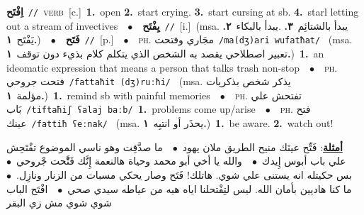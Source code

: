 \documentclass[10pt,a4paper,twoside]{article} %
\begin{document}
\begin{multicols}{2}
{{{\setlength\topsep{0pt}\textbf{\foreignlanguage{arabic}{اِفْتَح}}\ {\color{gray}\texttt{//}\color{black}}\ \textsc{verb}\ [c.]\ \textbf{1.}~open  \textbf{2.}~start crying.  \textbf{3.}~start cursing at sb.  \textbf{4.}~starl letting out a stream of invectives\ \ $\bullet$\ \ \setlength\topsep{0pt}\textbf{\foreignlanguage{arabic}{يِفْتَح}}\ {\color{gray}\texttt{//}\color{black}}\ [i.]\ \color{gray}(msa. \foreignlanguage{arabic}{يبدأ بالشتائِم}~\foreignlanguage{arabic}{\textbf{٣.}}  .\foreignlanguage{arabic}{يبدأ بالبكاء}~\foreignlanguage{arabic}{\textbf{٢.}}  \foreignlanguage{arabic}{يَفْتَح}~\foreignlanguage{arabic}{\textbf{١.}})\color{black}\ \ $\bullet$\ \ \setlength\topsep{0pt}\textbf{\foreignlanguage{arabic}{فَتَح}}\ {\color{gray}\texttt{//}\color{black}}\ [p.]\ \ $\bullet$\ \ \textsc{ph.} \color{gray} \foreignlanguage{arabic}{مجَاري وفتحت}\color{black}\ {\color{gray}\texttt{/{\sffamily ma(dʒ)ari wufatħat}/}\color{black}}\ \color{gray} (msa. \foreignlanguage{arabic}{تعبير اصطلاحي يقصد به الشخص الذي يتكلم كلام بذيء دون توقف}~\foreignlanguage{arabic}{\textbf{١.}})\color{black}\ \textbf{1.}~an ideomatic expression that means  a person that talks trash non-stop\ \ $\bullet$\ \ \textsc{ph.} \color{gray} \foreignlanguage{arabic}{فتحت جروحي}\color{black}\ {\color{gray}\texttt{/{\sffamily fattaħit (dʒ)ruːħi}/}\color{black}}\ \color{gray} (msa. \foreignlanguage{arabic}{يذكر شخص بذكريات مؤلمة}~\foreignlanguage{arabic}{\textbf{١.}})\color{black}\ \textbf{1.}~remind sb with painful memories\ \ $\bullet$\ \ \textsc{ph.} \color{gray} \foreignlanguage{arabic}{تفتحش علي بَاب}\color{black}\ {\color{gray}\texttt{/{\sffamily tiftaħiʃ ʕalaj baːb}/}\color{black}}\ \textbf{1.}~problems come up/arise\ \ $\bullet$\ \ \textsc{ph.} \color{gray} \foreignlanguage{arabic}{فتح عينك}\color{black}\ {\color{gray}\texttt{/{\sffamily fattiħ ʕeːnak}/}\color{black}}\ \color{gray} (msa. \foreignlanguage{arabic}{يحذَر أو انتبِه}~\foreignlanguage{arabic}{\textbf{١.}})\color{black}\ \textbf{1.}~be aware.  \textbf{2.}~watch out!\  \begin{flushright}\color{gray}\foreignlanguage{arabic}{\textbf{\underline{\foreignlanguage{arabic}{أمثلة}}}: فَتِّح عينَك منيح الطريق ملان يهود\ $\bullet$\ \  ما صدَّقِت وهو ناسي الموضوع تفْتَحِش علي باب أبوس إِيدك\ $\bullet$\ \  والله يا أخي أبو محمد وحياة هالنعمة إِنَّك فَتَّْحت جْروحي\ $\bullet$\ \  بس حكيتله انه يستنى علي شوي. هاتلك! فَتَح وصار يحكي مسبات من الزنار ونازِل.\ $\bullet$\ \  ما كنا هاديين بأمان الله. ليس لتِفْتحلنا اياه هيه من عياطه سيدي صحي\ $\bullet$\ \  افْتَح الباب شوي شوي مش زي البقر}\end{flushright}\color{black}} \vspace{2mm}

}}
\end{multicols}
\end{document}
